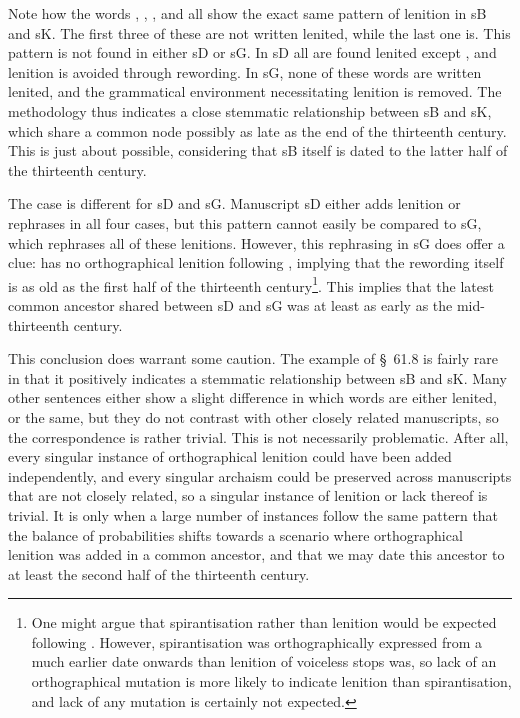 Note how the words , , , and  all show the exact same pattern of lenition in \gls{sB} and \gls{sK}. The first three of these are not written lenited, while the last one is. This pattern is not found in either \gls{sD} or \gls{sG}. In \gls{sD} all are found lenited except , and lenition is avoided through rewording. In \gls{sG}, none of these words are written lenited, and the grammatical environment necessitating lenition is removed. 
The methodology thus indicates a close stemmatic relationship between \gls{sB} and \gls{sK}, which share a common node possibly as late as the end of the thirteenth century. This is just about possible, considering that \gls{sB} itself is dated to the latter half of the thirteenth century.

The case is different for \gls{sD} and \gls{sG}. Manuscript \gls{sD} either adds lenition or rephrases in all four cases, but this pattern cannot easily be compared to \gls{sG}, which rephrases all of these lenitions. However, this rephrasing in \gls{sG} does offer a clue:  has no orthographical lenition following , implying that the rewording itself is as old as the first half of the thirteenth century\footnote{%
  One might argue that spirantisation rather than lenition would be expected following . However, spirantisation was orthographically expressed from a much earlier date onwards than lenition of voiceless stops was, so lack of an orthographical mutation is more likely to indicate lenition than spirantisation, and lack of any mutation is certainly not expected.}.
This implies that the latest common ancestor shared between \gls{sD} and \gls{sG} was at least as early as the mid-thirteenth century.

This conclusion does warrant some caution. The example of §~61.8 is fairly rare in that it positively indicates a stemmatic relationship between \gls{sB} and \gls{sK}. Many other sentences either show a slight difference in which words are either lenited, or the same, but they do not contrast with other closely related manuscripts, so the correspondence is rather trivial. This is not necessarily problematic. After all, every singular instance of orthographical lenition could have been added independently, and every singular archaism could be preserved across manuscripts that are not closely related, so a singular instance of lenition or lack thereof is trivial. It is only when a large number of instances follow the same pattern  that the balance of probabilities shifts towards a scenario where orthographical lenition was added in a common ancestor, and that we may date this ancestor to at least the second half of the thirteenth century.

